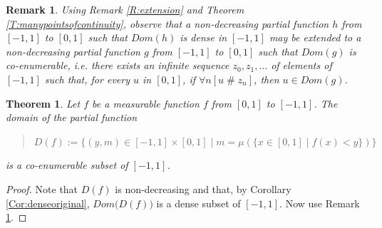 \documentclass[a4paper]{amsart}
\theoremstyle{plain}
\newtheorem{theorem}{Theorem}
\newtheorem{remark}{Remark}
\begin{document}
 \begin{remark}\label{R:co-enumerable} Using Remark  \ref{R:extension} and Theorem \ref{T:manypointsofcontinuity}, observe that a non-decreasing partial function $h$ from $[-1,1]$ to $[0, 1]$ such that $Dom(h)$ is dense in $[-1,1]$ may be extended to a non-decreasing partial function $g$ from $[-1,1]$ to $[0,1]$ such that $Dom(g)$ is \emph{co-enumerable}, i.e. there exists an infinite sequence $z_0, z_1, \ldots$ of elements of $[-1,1]$ such that, for every $u$ in $[0,1]$, if $\forall n[ u \;\#\;z_n]$, then $u\in Dom(g)$. \end{remark}
 
 \begin{theorem} Let $f$ be a measurable function $f$ from $[0,1]$ to $[-1,1]$.  The domain of the partial function \begin{quote}$D(f):=\{(y, m)\in [-1,1]\times [0,1]\mid m= \mu(\{x\in [0,1]\mid f(x)<y\})\}$ \end{quote}is a co-enumerable subset of $[-1,1]$. \end{theorem}
 
 \begin{proof} Note that $D(f)$ is non-decreasing and that, by Corollary \ref{Cor:denseoriginal}, $Dom\bigl(D(f)\bigr)$ is a dense subset of $[-1,1]$. Now use Remark \ref{R:co-enumerable}.\end{proof}
 
\end{document}
